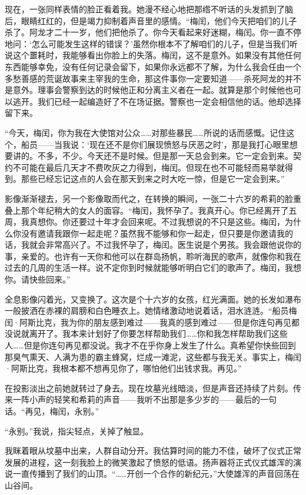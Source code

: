 \documentclass[AutoFakeBold=true]{book}
\begin{document}
现在，一张同样表情的脸正看着我。她漫不经心地把那绺不听话的头发抓到了脑后，眼睛红红的，但是竭力抑制着声音里的感情。``梅闰，他们今天把咱们的儿子杀了。阿龙才二十一岁，他们把他杀了。你今天看起来好迷糊，梅闰。你一直不停地问：`怎么可能发生这样的错误？'虽然你根本不了解咱们的儿子，但是当我们听说这个噩耗时，我能够看出你脸上的失落。梅闰，这不是意外。如果没有其他任何东西能够幸免，没有任何记录会留下，如果你永远都不了解，为什么我会任由一个多愁善感的荒诞故事来主宰我的生命，那这件事你一定要知道——杀死阿龙的并不是意外。理事会警察到达的时候他正和分离主义者在一起。就算是那个时候他也可以逃开。我们已经一起编造好了不在场证据。警察也一定会相信他的话。他却选择留下来。

``今天，梅闰，你为我在大使馆对公众……对那些暴民……所说的话而感慨。记住这个，船员——当我说：`现在还不是你们展现愤怒与厌恶之时'，那是我打心眼里想要讲的。不多，不少。今天还不是时候。但是那一天总会到来。它一定会到来。契约不可能在最后几天才不费吹灰之力得到，梅闰。但现在也不可能轻而易举就得到。那些已经忘记这点的人会在那天到来之时大吃一惊，但是它一定会到来。''

影像渐渐褪去，另一个影像取而代之，在转换的瞬间，一张二十六岁的希莉的脸重叠上那个年纪稍大的女人的面容。``梅闰，我怀孕了。我真开心。你已经离开了五周，我真想你。你还要过十年才会回来呢。不过我想说的不只是这些。梅闰，为什么你没有邀请我跟你一起走呢？虽然我不能够和你一起走，但只要是你邀请我的话，我就会非常高兴了。不过我怀孕了，梅闰。医生说是个男孩。我会跟他说你的事，亲爱的。也许有一天你和他可以在群岛扬帆，聆听海民的歌声，就像你和我在过去的几周的生活一样。说不定你到时候就能够听明白它们的歌声了。梅闰，我想你。请快些回来。''

全息影像闪着光，又变换了。这次是个十六岁的女孩，红光满面。她的长发如瀑布一般披洒在赤裸的肩膀和白色睡衣上。她情绪激动地说着话，泪水涟涟。``船员梅闰·阿斯比克，我为你的朋友感到难过——我真的感到难过——但是你连句再见都没说就离开了。我本来计划好了你要怎样帮助我们……你和我怎样帮助我们这些人……但是你连句再见都没说。我才不在乎你身上发生了什么。真希望你快些回到那臭气熏天、人满为患的霸主蜂窝，烂成一滩泥，这些都与我无关。事实上，梅闰·阿斯比克，我根本都不想再见你了，哪怕他们出钱求我。再见。''

在投影淡出之前她就转过了身去。现在坟墓光线暗淡，但是声音还持续了片刻。传来一阵小声的轻笑和希莉的声音——我听不出那是多少岁的——最后的一句话。``再见，梅闰，永别。''

``永别。''我说，指尖轻点，关掉了触显。

\vspace*{1em}

我眯着眼从坟墓中出来，人群自动分开。我估算时间的能力不佳，破坏了仪式正常发展的进程，这一刻我脸上的微笑激起了愤怒的低语。扬声器将正式仪式雄浑的演说一直传播到了我们的山顶。``……开创一个合作的新纪元，''大使雄浑的声音回荡在山谷间。
\end{document}

